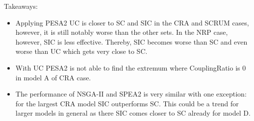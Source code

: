 \documentclass[a4paper, 12pt]{scrartcl}
\begin{document}
\clearpage

Takeaways:
\begin{itemize}
	\item Applying PESA2 UC is closer to SC and SIC in the CRA and SCRUM cases, however, it is still notably worse than the other sets.
	In the NRP case, however, SIC is less effective. Thereby, SIC becomes worse than SC and even worse than UC which gets very close to SC. 
	\item With UC PESA2 is not able to find the extremum where CouplingRatio is 0 in model A of CRA case.
	\item The performance of NSGA-II and SPEA2 is very similar with one exception: for the largest CRA model SIC outperforms SC.
	This could be a trend for larger models in general as there SIC comes closer to SC already for model D.
	
	
\end{itemize}
\end{document}
